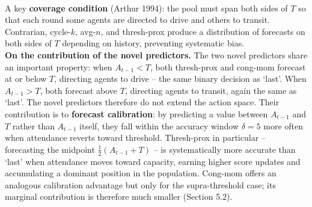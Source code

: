 \documentclass[letterpaper]{article}
\begin{document}
\begin{table}[t]
\centering
\small
{} \\
\caption{Predictor pool}
\label{tab:predictors}
\end{table}

A key \textbf{coverage condition} (Arthur 1994): the pool must span both sides of $T$ so that each round some agents are directed to drive and others to transit. Contrarian, cycle-$k$, avg-$n$, and thresh-prox produce a distribution of forecasts on both sides of $T$ depending on history, preventing systematic bias. \\

\textbf{On the contribution of the novel predictors.} The two novel predictors share an important property: when $A_{t-1} < T$, both thresh-prox and cong-mom forecast at or below $T$, directing agents to drive -- the same binary decision as `last'. When $A_{t-1} > T$, both forecast above $T$, directing agents to transit, again the same as `last'. The novel predictors therefore do not extend the action space. Their contribution is to \textbf{forecast calibration}: by predicting a value between $A_{t-1}$ and $T$ rather than $A_{t-1}$ itself, they fall within the accuracy window $\delta=5$ more often when attendance reverts toward threshold. Thresh-prox in particular -- forecasting the midpoint $\frac{1}{2}(A_{t-1}+T)$ -- is systematically more accurate than `last' when attendance moves toward capacity, earning higher score updates and accumulating a dominant position in the population. Cong-mom offers an analogous calibration advantage but only for the supra-threshold case; its marginal contribution is therefore much smaller (Section 5.2). \\
\end{document}
